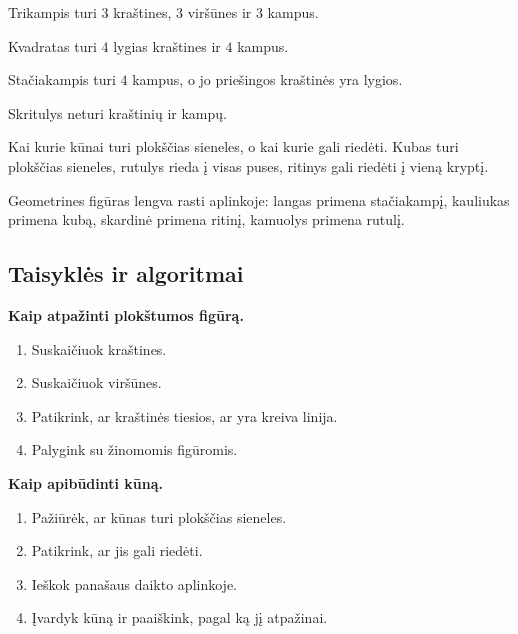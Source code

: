 \begin{savybe}
Trikampis turi \(3\) kraštines, \(3\) viršūnes ir \(3\) kampus.
\end{savybe}

\begin{savybe}
Kvadratas turi \(4\) lygias kraštines ir \(4\) kampus.
\end{savybe}

\begin{savybe}
Stačiakampis turi \(4\) kampus, o jo priešingos kraštinės yra lygios.
\end{savybe}

\begin{savybe}
Skritulys neturi kraštinių ir kampų.
\end{savybe}

\begin{savybe}
Kai kurie kūnai turi plokščias sieneles, o kai kurie gali riedėti. Kubas turi plokščias sieneles, rutulys rieda į visas puses, ritinys gali riedėti į vieną kryptį.
\end{savybe}

\begin{pastaba}
Geometrines figūras lengva rasti aplinkoje: langas primena stačiakampį, kauliukas primena kubą, skardinė primena ritinį, kamuolys primena rutulį.
\end{pastaba}

\subsection{Taisyklės ir algoritmai}

\textbf{Kaip atpažinti plokštumos figūrą.}
\begin{enumerate}
\item Suskaičiuok kraštines.
\item Suskaičiuok viršūnes.
\item Patikrink, ar kraštinės tiesios, ar yra kreiva linija.
\item Palygink su žinomomis figūromis.
\end{enumerate}

\textbf{Kaip apibūdinti kūną.}
\begin{enumerate}
\item Pažiūrėk, ar kūnas turi plokščias sieneles.
\item Patikrink, ar jis gali riedėti.
\item Ieškok panašaus daikto aplinkoje.
\item Įvardyk kūną ir paaiškink, pagal ką jį atpažinai.
\end{enumerate}

